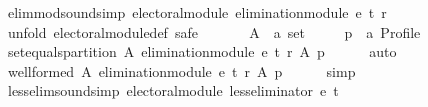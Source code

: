 \begin{isabellebody}
\isadelimdocument
%
\endisadelimdocument
%
\isatagdocument
%
\isamarkuptrue%
%
\endisatagdocument
{\isafolddocument}%
%
\isadelimdocument
%
\endisadelimdocument
{}\isamarkupfalse%
\ elim{\isacharunderscore}{\kern0pt}mod{\isacharunderscore}{\kern0pt}sound{\isacharbrackleft}{\kern0pt}simp{\isacharbrackright}{\kern0pt}{\isacharcolon}{\kern0pt}\ {\isachardoublequoteopen}electoral{\isacharunderscore}{\kern0pt}module\ {\isacharparenleft}{\kern0pt}elimination{\isacharunderscore}{\kern0pt}module\ e\ t\ r{\isacharparenright}{\kern0pt}{\isachardoublequoteclose}\isanewline
%
\isadelimproof
%
\endisadelimproof
%
\isatagproof
{}\isamarkupfalse%
\ {\isacharparenleft}{\kern0pt}unfold\ electoral{\isacharunderscore}{\kern0pt}module{\isacharunderscore}{\kern0pt}def{\isacharcomma}{\kern0pt}\ safe{\isacharparenright}{\kern0pt}\isanewline
\ \ \isamarkupfalse%
\isanewline
\ \ \ \ A\ {\isacharcolon}{\kern0pt}{\isacharcolon}{\kern0pt}\ {\isachardoublequoteopen}{\isacharprime}{\kern0pt}a\ set{\isachardoublequoteclose}\ \isanewline
\ \ \ \ p\ {\isacharcolon}{\kern0pt}{\isacharcolon}{\kern0pt}\ {\isachardoublequoteopen}{\isacharprime}{\kern0pt}a\ Profile{\isachardoublequoteclose}\isanewline
\ \ \isamarkupfalse%
\ {\isachardoublequoteopen}set{\isacharunderscore}{\kern0pt}equals{\isacharunderscore}{\kern0pt}partition\ A\ {\isacharparenleft}{\kern0pt}elimination{\isacharunderscore}{\kern0pt}module\ e\ t\ r\ A\ p{\isacharparenright}{\kern0pt}{\isachardoublequoteclose}\isanewline
\ \ \ \ \isamarkupfalse%
\ auto\isanewline
\ \ \isamarkupfalse%
\ {\isachardoublequoteopen}well{\isacharunderscore}{\kern0pt}formed\ A\ {\isacharparenleft}{\kern0pt}elimination{\isacharunderscore}{\kern0pt}module\ e\ t\ r\ A\ p{\isacharparenright}{\kern0pt}{\isachardoublequoteclose}\isanewline
\ \ \ \ \isamarkupfalse%
\ simp\isanewline
{}\isamarkupfalse%
%
\endisatagproof
{\isafoldproof}%
%
\isadelimproof
\isanewline
%
\endisadelimproof
\isanewline
{}\isamarkupfalse%
\ less{\isacharunderscore}{\kern0pt}elim{\isacharunderscore}{\kern0pt}sound{\isacharbrackleft}{\kern0pt}simp{\isacharbrackright}{\kern0pt}{\isacharcolon}{\kern0pt}\ {\isachardoublequoteopen}electoral{\isacharunderscore}{\kern0pt}module\ {\isacharparenleft}{\kern0pt}less{\isacharunderscore}{\kern0pt}eliminator\ e\ t{\isacharparenright}{\kern0pt}{\isachardoublequoteclose}\isanewline
%
\isadelimproof
\ \ %
\endisadelimproof
%
\isatagproof
{}\isamarkupfalse%

\end{isabellebody}
